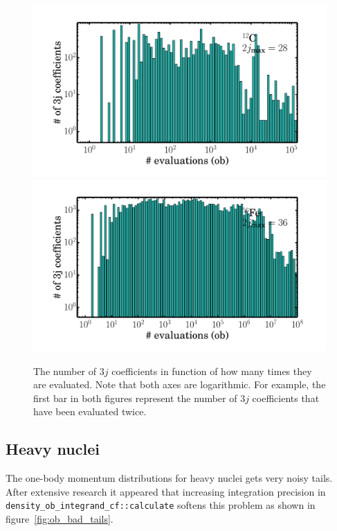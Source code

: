 \documentclass[10pt]{article}
\begin{document}
\begin{figure}
\centering
\includegraphics[width=\textwidth]{figures/threej_evals_12C.pdf}
\includegraphics[width=\textwidth]{figures/threej_evals_56Fe.pdf}
\caption{The number of $3j$ coefficients in function of how many times they are evaluated. Note that both axes are logarithmic. For example, the first bar in both figures represent the number of $3j$ coefficients that have been evaluated twice.}
\end{figure}

\subsection{Heavy nuclei}

The one-body momentum distributions for heavy nuclei gets very noisy tails.
After extensive research it appeared that increasing integration precision
in \texttt{density\_ob\_integrand\_cf::calculate} softens this problem as shown in
figure~\ref{fig:ob_bad_tails}.

\end{document}
